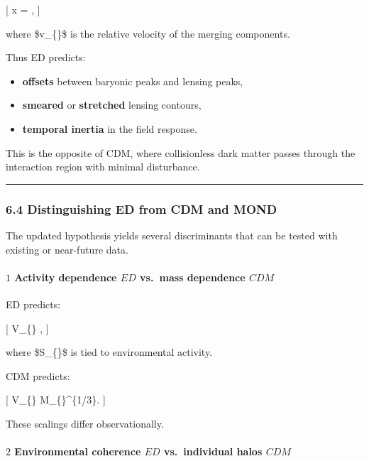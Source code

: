 {[} \Delta x = ,  {]}

where \$v\_\{\}\$ is the relative velocity of the merging
components.

Thus ED predicts:

\begin{itemize}
\tightlist
\item
  \textbf{offsets} between baryonic peaks and lensing peaks,\\
\item
  \textbf{smeared} or \textbf{stretched} lensing contours,\\
\item
  \textbf{temporal inertia} in the field response.
\end{itemize}

This is the opposite of CDM, where collisionless dark matter passes
through the interaction region with minimal disturbance.

\begin{center}\rule{0.5\linewidth}{0.5pt}\end{center}

\subsubsection{6.4 Distinguishing ED from CDM and
MOND}\label{distinguishing-ed-from-cdm-and-mond}

The updated hypothesis yields several discriminants that can be tested
with existing or near-future data.

\paragraph{\texorpdfstring{\textbf{\(1\) Activity dependence \(ED\)
vs.~mass dependence
\(CDM\)}}{1 Activity dependence ED vs.~mass dependence CDM}}\label{activity-dependence-ed-vs.-mass-dependence-cdm}

ED predicts:

{[} V\_\{\infty\} \propto {}
\propto {},  {]}

where \$S\_\{\}\$ is tied to environmental activity.

CDM predicts:

{[} V\_\{\infty\} \propto M\_\{\}\^{}\{1/3\}.  {]}

These scalings differ observationally.

\paragraph{\texorpdfstring{\textbf{\(2\) Environmental coherence \(ED\)
vs.~individual halos
\(CDM\)}}{2 Environmental coherence ED vs.~individual halos CDM}}\label{environmental-coherence-ed-vs.-individual-halos-cdm}

